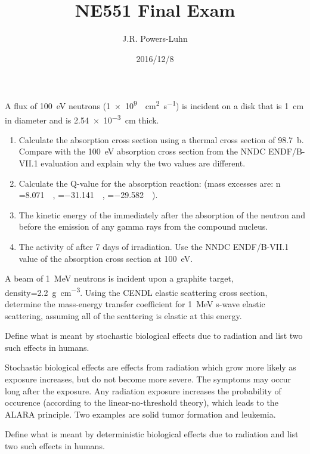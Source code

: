 \documentclass{hw}
\author{J.R. Powers-Luhn}
\date{2016/12/8}
\title{NE551 Final Exam}
\begin{document}
\problem{}
A flux of \SI{100}{\electronvolt} neutrons 
(\SI{1e9}{\per\centi\meter^2\per\second}) is incident on a  disk 
that is \SI{1}{\centi\meter} in diameter and is \SI{2.54e-3}{\centi\meter} thick.
\begin{enumerate}
    \item Calculate the absorption cross section using a thermal cross section 
    of \SI{98.7}{\barn}. Compare with the \SI{100}{\electronvolt} absorption 
    cross section from the NNDC ENDF/B-VII.1 evaluation and explain why the two 
    values are different.
    \item Calculate the Q-value for the absorption reaction:  (mass excesses are: 
    $\mathrm{n}$=\SI{8.071}{\mega\eVperc}, 
    =\SI{-31.141}{\mega\eVperc}, 
    =\SI{-29.582}{\mega\eVperc}).
    \item The kinetic energy of the  immediately after the 
    absorption of the neutron and before the emission of any gamma rays from 
    the compound  nucleus.
    \item The activity of  after 7 days of irradiation. Use the 
    NNDC ENDF/B-VII.1 value of the absorption cross section at 
    \SI{100}{\electronvolt}.
\end{enumerate}

\solution

\problem{}
A beam of \SI{1}{\mega\electronvolt} neutrons is incident upon a  
graphite target, density=\SI{2.2}{\gram\per\centi\meter^3}. Using the CENDL 
elastic scattering cross section, determine the mass-energy transfer 
coefficient for \SI{1}{\mega\electronvolt}  s-wave elastic 
scattering, assuming all of the scattering is elastic at this energy.

\solution

\problem{}
Define what is meant by stochastic biological effects due to radiation and list 
two such effects in humans.

\solution
Stochastic biological effects are effects from radiation which grow more likely 
as exposure increases, but do not become more severe. The symptoms may occur 
long after the exposure. Any radiation exposure increases the probability of 
occurence (according to the linear-no-threshold theory), which leads to the 
ALARA principle. Two examples are solid tumor formation and leukemia.

\problem{}
Define what is meant by deterministic biological effects due to radiation and 
list two such effects in humans.
\end{document}
